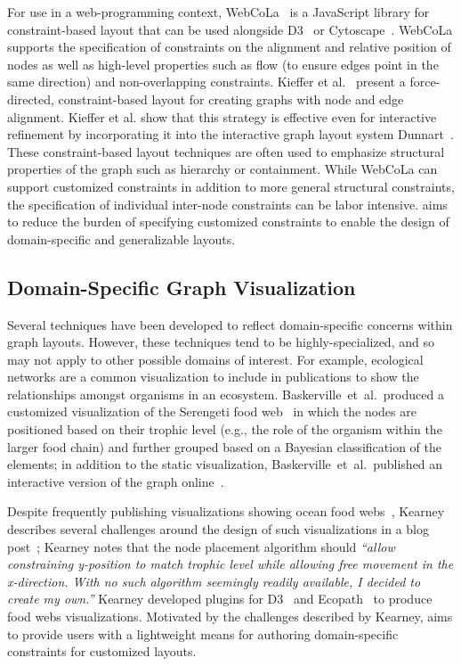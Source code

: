 For use in a web-programming context, WebCoLa~\cite{WebCoLa} is a 
JavaScript library for constraint-based layout that can be used alongside
D3~\cite{bostock:d3} or Cytoscape~\cite{shannon2003cytoscape}.
WebCoLa supports the specification of constraints on the alignment and relative
position of nodes as well as high-level properties such as flow (to ensure
edges point in the same direction) and non-overlapping constraints.
Kieffer et al.~\cite{kieffer2013incremental} present a force-directed,
constraint-based layout for creating graphs with node and edge alignment.
Kieffer et al. show that this strategy is effective even for interactive refinement 
by incorporating it into the interactive graph layout system Dunnart~\cite{dwyer2008dunnart}. 
These constraint-based layout techniques are often used to emphasize structural properties of
the graph such as hierarchy or containment. While WebCoLa can support 
customized constraints in addition to more general structural constraints,
the specification of individual inter-node constraints can be labor intensive.
\projectname aims to reduce the burden of specifying customized constraints
to enable the design of domain-specific and generalizable layouts.

\subsection{Domain-Specific Graph Visualization}
Several techniques have been developed to reflect domain-specific concerns
within graph layouts. However, these techniques
tend to be highly-specialized, and so may not apply to other possible
domains of interest. For example, ecological networks are a common visualization
to include in publications to show the relationships amongst organisms in
an ecosystem. Baskerville~et~al.\ produced a customized visualization of 
the Serengeti food web~\cite{baskerville2011spatial} in which the nodes
are positioned based on their trophic level (e.g., the role of the
organism within the larger food chain) and further grouped based on a
Bayesian classification of the elements;  in addition to the 
static visualization, Baskerville~et~al.\ 
published an interactive version of the graph online~\cite{baskerville2011interactive}. 

Despite frequently publishing visualizations showing ocean food 
webs~\cite{kearney2012coupling,kearney2013amplification},
Kearney describes several challenges around the design of such visualizations
in a blog post~\cite{kearney2016blog}; Kearney notes that the node
placement algorithm should \emph{``allow constraining y-position to match
  trophic level while allowing free movement in the x-direction. With no
  such algorithm seemingly readily available, I decided to create my
  own.''} Kearney developed plugins for D3~\cite{kearney2017d3} and
Ecopath~\cite{kearney2017ecopath} to produce food webs visualizations. 
Motivated by the challenges described by Kearney, \projectname aims to provide users
with a lightweight means for authoring domain-specific constraints for customized layouts.

